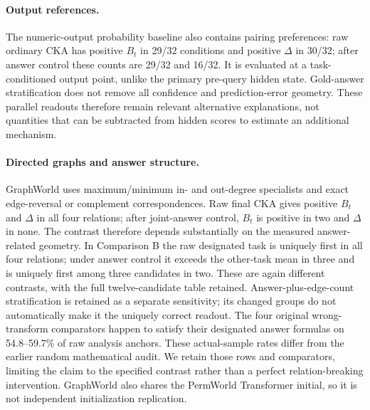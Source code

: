 \documentclass[10pt]{article}
\begin{document}
\paragraph{Output references.}
The numeric-output probability baseline also contains pairing preferences:
raw ordinary CKA has positive $B_t$ in 29/32 conditions and positive
$\Delta$ in 30/32; after answer control these counts are 29/32 and 16/32.
It is evaluated at a task-conditioned output point, unlike the primary
pre-query hidden state. Gold-answer stratification does not remove all
confidence and prediction-error geometry. These parallel readouts therefore
remain relevant alternative explanations, not quantities that can be
subtracted from hidden scores to estimate an additional mechanism.

\paragraph{Directed graphs and answer structure.}
GraphWorld uses maximum/minimum in- and out-degree specialists and exact
edge-reversal or complement correspondences. Raw final CKA gives positive
$B_t$ and $\Delta$ in all four relations; after joint-answer control,
$B_t$ is positive in two and $\Delta$ in none. The contrast therefore
depends substantially on the measured answer-related geometry.
In Comparison B the raw designated task is uniquely first in all four
relations; under answer control it exceeds the other-task mean in three
and is uniquely first among three candidates in two. These are again
different contrasts, with the full twelve-candidate table retained.
Answer-plus-edge-count stratification is retained as a separate sensitivity;
its changed groups do not automatically make it the uniquely correct
readout. The four original wrong-transform comparators happen to satisfy
their designated answer formulas on 54.8--59.7\% of raw analysis anchors.
These actual-sample rates differ from the earlier random mathematical
audit. We retain those rows and comparators, limiting the claim to the
specified contrast rather than a perfect relation-breaking intervention.
GraphWorld also shares the PermWorld Transformer initial, so it is not
independent initialization replication.



\begin{table}[t]
\centering\small

\caption{R1 as an illustrative disagreement case. Both column/row-weight
specialists achieve 100\% identity-input accuracy at each size in training,
validation, and analysis. Equal-$n$ answer-controlled CKA preferences are
negative in both units, while neighbor and negative-error Procrustes
preferences are positive. Each readout has its own scale. This table does
not assert agreement at every individual $n$.}
\label{tab:matrix_r1}
\end{table}
\end{document}
